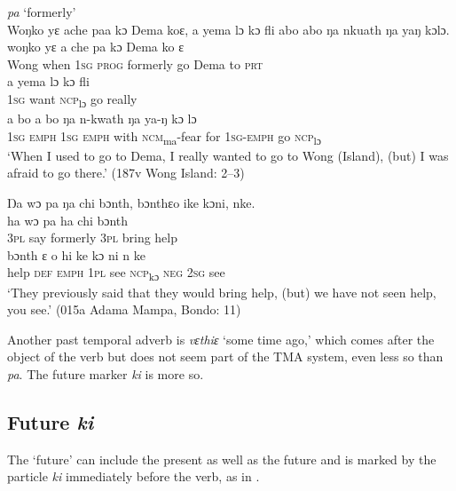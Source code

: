 \ea%
    \label{ex:126}
    \textit{pa} ‘formerly'\\
    \ea \label{ex:126a} Woŋko yɛ ache paa kɔ Dema  koɛ, a yema lɔ kɔ fli abo abo ŋa nkuath ŋa yaŋ kɔlɔ.\\
    \gll woŋko   yɛ       a     che   pa         kɔ    Dema     ko    ɛ\\
    Wong  when    \textsc{1sg}  \textsc{prog}  formerly    go    Dema     to    \textsc{prt}\\
    \gll a    yema    lɔ      kɔ    fli\\
    \textsc{1sg}  want    \textsc{ncp}\textsubscript{lɔ}    go    really\\
    \gll a    bo    a    bo      ŋa    n-kwath      ŋa    ya-ŋ      kɔ    lɔ\\
    \textsc{1sg}  \textsc{emph}  \textsc{1sg}  \textsc{emph}    with  \textsc{ncm}\textsubscript{ma}{}-fear    for    \textsc{1sg-emph}  go    \textsc{ncp}\textsubscript{lɔ}\\
    \glt ‘When I used to go to Dema, I really wanted to go to Wong (Island), (but) I was afraid to go there.' (187v Wong Island: 2--3)

    \ex \label{ex:126b} Ŋa wɔ pa ŋa chi bɔnth, bɔnthɛo ike kɔni, nke.\\
    \gll ha    wɔ    pa        ha    chi    bɔnth\\
    \textsc{3pl}  say  formerly    \textsc{3pl}  bring    help\\
    \gll bɔnth    ɛ    o      hi    ke    kɔ    ni    n    ke\\
    help    \textsc{def}  \textsc{emph}    \textsc{1pl}  see  \textsc{ncp}\textsubscript{kɔ}  \textsc{neg}  \textsc{2sg}  see\\
    \glt ‘They previously said that they would bring help, (but) we have not seen help, you see.' (015a Adama Mampa, Bondo: 11)
\z
\z

Another past temporal adverb is \textit{vɛthiɛ} ‘some time ago,' which comes after the object of the verb but does not seem part of the TMA system, even less so than \textit{pa}. The future marker \textit{ki} is more so.

\subsection{Future \textit{ki}}
\label{sec:4.3.3}
The ‘future' can include the present as well as the future and is marked by the particle \textit{ki} immediately before the verb, as in .

